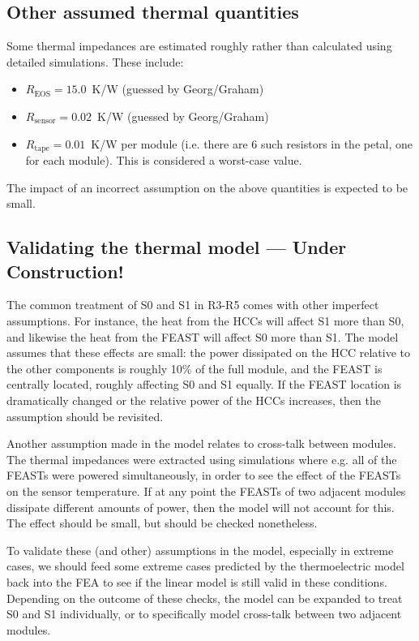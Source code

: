 \subsection{Other assumed thermal quantities}

Some thermal impedances are estimated roughly rather than calculated using detailed simulations.
These include:
%
\begin{itemize}
\item $R_\text{EOS}=15.0$~K/W (guessed by Georg/Graham)
\item $R_\text{sensor}=0.02$~K/W (guessed by Georg/Graham)
\item $R_\text{tape}=0.01$~K/W per module (i.e. there are 6 such resistors in the petal, one
for each module). This is considered a worst-case value.
\end{itemize}
%
The impact of an incorrect assumption on the above quantities is expected to be small.

\subsection{Validating the thermal model --- Under Construction!}
\label{thermal_validation}

The common treatment of S0 and S1 in R3-R5 comes with other imperfect assumptions.
For instance, the heat from the HCCs will affect S1 more than S0, and likewise the heat from the FEAST
will affect S0 more than S1. The model assumes that these effects are small: the power dissipated on
the HCC relative to the other components is roughly 10\% of the full module, and the FEAST is centrally
located, roughly affecting S0 and S1 equally. If the FEAST location is dramatically changed or the
relative power of the HCCs increases, then the assumption should be revisited.

Another assumption made in the model relates to cross-talk between modules. The thermal impedances were
extracted using simulations where e.g. all of the FEASTs were powered simultaneously, in order to see
the effect of the FEASTs on the sensor temperature. If at any point the FEASTs of two adjacent modules
dissipate different amounts of power, then the model will not account for this. The effect should be
small, but should be checked nonetheless.

To validate these (and other) assumptions in the model, especially in extreme cases, we should feed
some extreme cases predicted by the thermoelectric model back into the FEA to see if the linear model
is still valid in these conditions. Depending on the outcome of these checks, the model can be expanded
to treat S0 and S1 individually, or to specifically model cross-talk between two adjacent modules.
